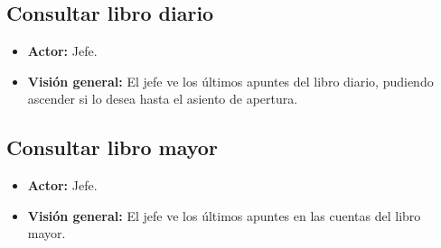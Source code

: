 \documentclass[spanish,a4paper,11pt, twoside]{report}	%
\begin{document}

	\subsection{Consultar libro diario}
		\begin{itemize}
			\item \textbf{Actor:} Jefe.
			\item \textbf{Visión general:} El jefe ve los últimos apuntes del libro diario, 
				pudiendo ascender si lo desea hasta el asiento de apertura.	
		\end {itemize}


	\subsection{Consultar libro mayor}
		\begin{itemize}
			\item \textbf{Actor:} Jefe.
			\item \textbf{Visión general:} El jefe ve los últimos apuntes en las cuentas del libro mayor. 
		\end {itemize}



\newpage
\mbox{}
\thispagestyle{empty}						%
\newpage
\end{document}
